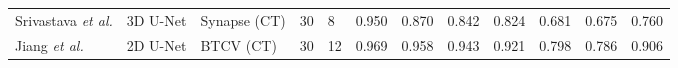 \documentclass[lettersize,journal]{IEEEtran}
\begin{document}
{\begin{table*}[ht!]
{\begin{tabular}{@{}llllllllllll@{}}
Srivastava {\it{et al.}} \cite{49}                & 3D U-Net                  & Synapse (CT) \cite{2}                                                & 30                                  & 8          & 0.950        & 0.870        & 0.842              & 0.824             & 0.681          & 0.675             & 0.760         \\
Jiang {\it{et al.}} \cite{52}                      & 2D U-Net                  & BTCV (CT) \cite{29}                                                  & 30                                  & 12         & 0.969        & 0.958        & 0.943              & 0.921             & 0.798          & 0.786             & 0.906         \\ \bottomrule
\end{tabular}%
}
\end{table*}

}
\end{document}
